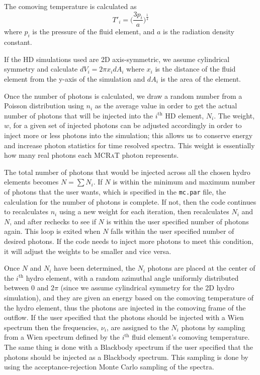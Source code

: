 \documentclass[12pt,a4paper]{article}
\newcommand{\mcrat}{\textsc{MCRaT}}
\begin{document}
The comoving temperature is calculated as
\begin{equation}
T'_i=\big( \frac{3p_i}{a} \big)^\frac{1}{4}
\end{equation}
where $p_i$ is the pressure of the fluid element, and $a$ is the radiation density constant.
 
If the HD simulations used are 2D axis-symmetric, we assume cylindrical symmetry and calculate $dV_i=2\pi x_idA_i$ where $x_i$ is the distance of the fluid element from the y-axis of the simulation and $dA_i$ is the area of the element. 
 
Once the number of photons is calculated, we draw a random number from a Poisson distribution using $n_i$ as the average value in order to get the actual number of photons that will be injected into the $i^\text{th}$ HD element, $N_i$. The weight, $w$, for a given set of injected photons can be adjusted accordingly in order to inject more or less photons into the simulation; this allows us to conserve energy and increase photon statistics for time resolved spectra. This weight is essentially how many real photons each \mcrat{} photon represents.

The total number of photons that would be injected across all the chosen hydro elements becomes $N=\sum N_i$. If $N$ is within the minimum and maximum number of photons that the user wants, which is specified in the \texttt{mc.par} file, the calculation for the number of photons is complete. If not, then the code continues to recalculates $n_i$ using a new weight for each iteration, then recalculates $N_i$ and $N$, and after rechecks to see if $N$ is within the user specified number of photons again. This loop is exited when $N$ falls within the user specified number of desired photons. If the code needs to inject more photons to meet this condition, it will adjust the weights to be smaller and vice versa.

Once $N$ and $N_i$ have been determined, the $N_i$ photons are placed at the center of the $i^\mathrm{th}$ hydro element, with a random azimuthal angle uniformly distributed between $0$ and $2\pi$ (since we assume cylindrical symmetry for the 2D hydro simulation), and they are given an energy based on the comoving temperature of the hydro element, thus the photons are injected in the comoving frame of the outflow. If the user specified that the photons should be injected with a Wien spectrum then the frequencies, $\nu_i$, are assigned to the $N_i$ photons by sampling from a Wien spectrum defined by the $i^\mathrm{th}$ fluid element's comoving temperature. The same thing is done with a Blackbody spectrum if the user specified that the photons should be injected as a Blackbody spectrum. This sampling is done by using the acceptance-rejection Monte Carlo sampling of the spectra.
\end{document}
